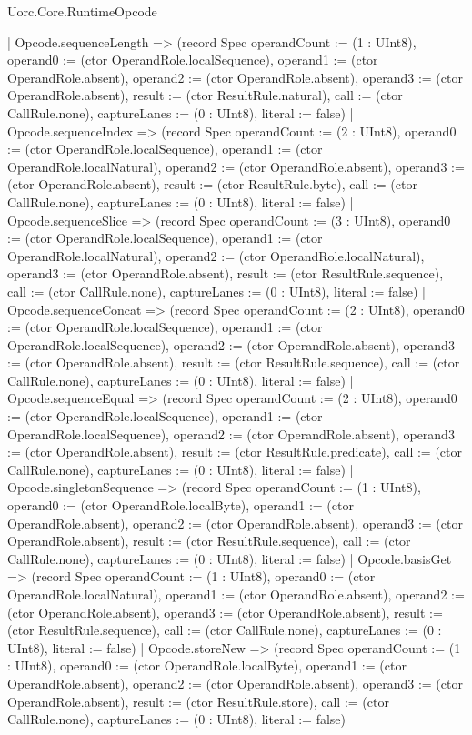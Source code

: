 \begin{lexlean}{Uorc.Core.RuntimeOpcode}
\begin{semanticmodule}
{    | Opcode.sequenceLength => (record Spec {operandCount := (1 : UInt8), operand0 := (ctor OperandRole.localSequence), operand1 := (ctor OperandRole.absent), operand2 := (ctor OperandRole.absent), operand3 := (ctor OperandRole.absent), result := (ctor ResultRule.natural), call := (ctor CallRule.none), captureLanes := (0 : UInt8), literal := false})
    | Opcode.sequenceIndex => (record Spec {operandCount := (2 : UInt8), operand0 := (ctor OperandRole.localSequence), operand1 := (ctor OperandRole.localNatural), operand2 := (ctor OperandRole.absent), operand3 := (ctor OperandRole.absent), result := (ctor ResultRule.byte), call := (ctor CallRule.none), captureLanes := (0 : UInt8), literal := false})
    | Opcode.sequenceSlice => (record Spec {operandCount := (3 : UInt8), operand0 := (ctor OperandRole.localSequence), operand1 := (ctor OperandRole.localNatural), operand2 := (ctor OperandRole.localNatural), operand3 := (ctor OperandRole.absent), result := (ctor ResultRule.sequence), call := (ctor CallRule.none), captureLanes := (0 : UInt8), literal := false})
    | Opcode.sequenceConcat => (record Spec {operandCount := (2 : UInt8), operand0 := (ctor OperandRole.localSequence), operand1 := (ctor OperandRole.localSequence), operand2 := (ctor OperandRole.absent), operand3 := (ctor OperandRole.absent), result := (ctor ResultRule.sequence), call := (ctor CallRule.none), captureLanes := (0 : UInt8), literal := false})
    | Opcode.sequenceEqual => (record Spec {operandCount := (2 : UInt8), operand0 := (ctor OperandRole.localSequence), operand1 := (ctor OperandRole.localSequence), operand2 := (ctor OperandRole.absent), operand3 := (ctor OperandRole.absent), result := (ctor ResultRule.predicate), call := (ctor CallRule.none), captureLanes := (0 : UInt8), literal := false})
    | Opcode.singletonSequence => (record Spec {operandCount := (1 : UInt8), operand0 := (ctor OperandRole.localByte), operand1 := (ctor OperandRole.absent), operand2 := (ctor OperandRole.absent), operand3 := (ctor OperandRole.absent), result := (ctor ResultRule.sequence), call := (ctor CallRule.none), captureLanes := (0 : UInt8), literal := false})
    | Opcode.basisGet => (record Spec {operandCount := (1 : UInt8), operand0 := (ctor OperandRole.localNatural), operand1 := (ctor OperandRole.absent), operand2 := (ctor OperandRole.absent), operand3 := (ctor OperandRole.absent), result := (ctor ResultRule.sequence), call := (ctor CallRule.none), captureLanes := (0 : UInt8), literal := false})
    | Opcode.storeNew => (record Spec {operandCount := (1 : UInt8), operand0 := (ctor OperandRole.localByte), operand1 := (ctor OperandRole.absent), operand2 := (ctor OperandRole.absent), operand3 := (ctor OperandRole.absent), result := (ctor ResultRule.store), call := (ctor CallRule.none), captureLanes := (0 : UInt8), literal := false})
}
\end{semanticmodule}
\end{lexlean}
